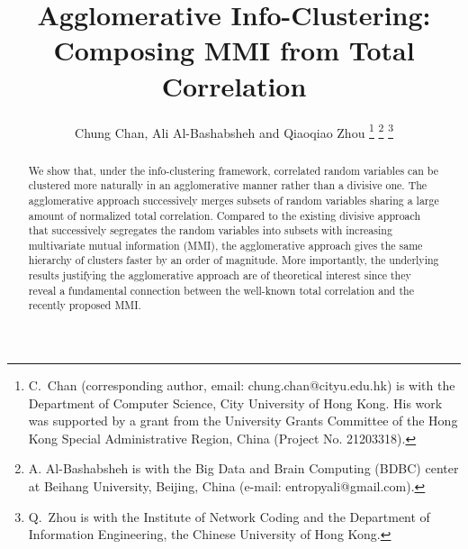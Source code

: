 \documentclass[letterpaper,onecolumn,draftcls]{IEEEtran}
\title{Agglomerative Info-Clustering:\\ Composing MMI from Total Correlation}
\author{Chung Chan, Ali Al-Bashabsheh and Qiaoqiao Zhou
	\thanks{C.\ Chan (corresponding author, email:
          chung.chan@cityu.edu.hk) is with the Department of Computer Science, City University of Hong Kong. His work was supported by a grant
          from the University Grants Committee of the Hong Kong Special Administrative Region,
          China (Project No. 21203318).}
        \thanks{A. Al-Bashabsheh is with the Big Data and Brain
          Computing (BDBC) center at Beihang University, Beijing, China (e-mail:
          entropyali@gmail.com).}
        \thanks{Q.\ Zhou is with the Institute of Network Coding and the Department of Information Engineering, the Chinese University of Hong Kong.
	}
	}
\begin{document}

%
\IEEEoverridecommandlockouts
\maketitle

\begin{abstract}
We show that, under the info-clustering framework, correlated random variables can be clustered more naturally in an agglomerative manner rather than a divisive one. The agglomerative approach successively merges subsets of random variables sharing a large amount of normalized total correlation. Compared to the existing divisive approach that successively segregates the random variables into subsets with increasing multivariate mutual information (MMI), the agglomerative approach gives the same hierarchy of clusters faster by an order of magnitude.  More importantly, the underlying results justifying the agglomerative approach are of theoretical interest since they reveal a fundamental connection between the well-known total correlation and the recently proposed MMI. %
\end{abstract} 






\end{document}
